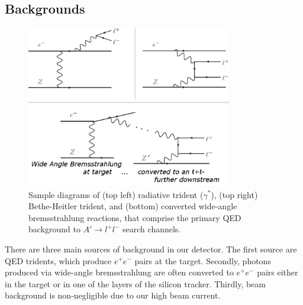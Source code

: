\documentclass[b1]{sciposter}
\begin{document}
\begin{multicols}{3}
	\subsection*{Backgrounds}
	\begin{figure}
		\begin{center}
			\includegraphics[width=0.8\textwidth]{trident_wab}
		\end{center}
		\caption{Sample diagrams of (top left) radiative trident ($\gamma^*$), (top right) Bethe-Heitler trident, and (bottom) converted wide-angle bremsstrahlung reactions, that comprise the primary QED background to $A'\to l^+l^-$ search channels.}
	\end{figure}


There are three main sources of background in our detector.  The first source are QED tridents, which produce $e^+e^-$ pairs at the target.  Secondly, photons produced via wide-angle bremsstrahlung are often converted to $e^+e^-$ pairs either in the target or in one of the layers of the silicon tracker.  Thirdly, beam background is non-negligible due to our high beam current.


\end{multicols}
\end{document}
